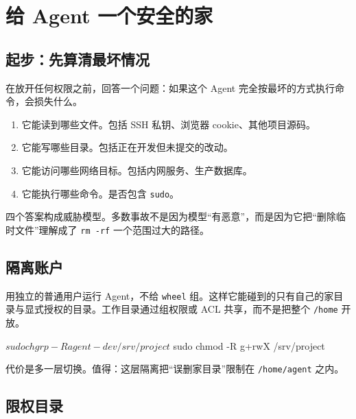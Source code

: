 \chapter{给 Agent 一个安全的家}
\label{ch:agent-safety}

\section{起步：先算清最坏情况}

在放开任何权限之前，回答一个问题：如果这个 Agent 完全按最坏的方式执行命令，会损失什么。

\begin{enumerate}
  \item 它能读到哪些文件。包括 SSH 私钥、浏览器 cookie、其他项目源码。
  \item 它能写哪些目录。包括正在开发但未提交的改动。
  \item 它能访问哪些网络目标。包括内网服务、生产数据库。
  \item 它能执行哪些命令。是否包含 \texttt{sudo}。
\end{enumerate}

四个答案构成威胁模型。多数事故不是因为模型“有恶意”，而是因为它把“删除临时文件”理解成了 \texttt{rm -rf} 一个范围过大的路径。

\section{隔离账户}


用独立的普通用户运行 Agent，不给 \texttt{wheel} 组。这样它能碰到的只有自己的家目录与显式授权的目录。工作目录通过组权限或 ACL 共享，而不是把整个 \texttt{/home} 开放。

\begin{shellsession}
$ sudo chgrp -R agent-dev /srv/project
$ sudo chmod -R g+rwX /srv/project
\end{shellsession}

代价是多一层切换。值得：这层隔离把“误删家目录”限制在 \texttt{/home/agent} 之内。

\section{限权目录}

